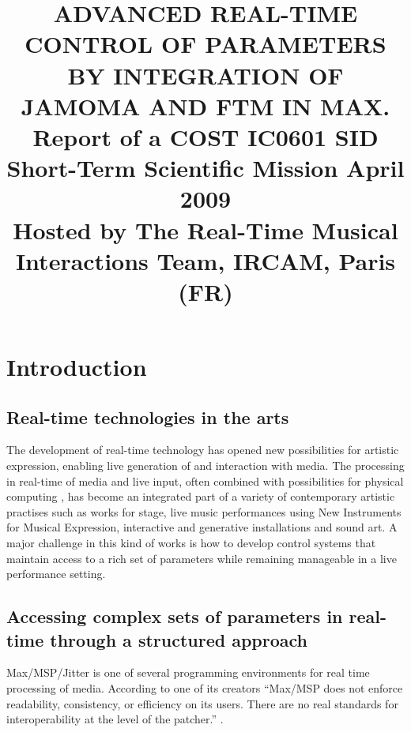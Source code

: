 \documentclass{article}
\title{ADVANCED REAL-TIME CONTROL OF PARAMETERS \\BY INTEGRATION OF JAMOMA AND FTM IN MAX.\\
Report of a COST IC0601 SID Short-Term Scientific Mission April 2009 \\Hosted by The Real-Time Musical Interactions Team, IRCAM, Paris (FR)}
\begin{document}
%    
\sloppy
\maketitle
%

\permission

\begin{abstract}  



\end{abstract}

\section{Introduction}\label{sec:introduction}        


\subsection{Real-time technologies in the arts}

The development of real-time technology has opened new possibilities for artistic expression, enabling live generation of and interaction with media. The processing in real-time of media and live input, often combined with possibilities for physical computing \cite{Sullivan_2004_physical_computing}, has become an integrated part of a variety of contemporary artistic practises such as works for stage, live music performances using New Instruments for Musical Expression, interactive and generative installations and sound art. A major challenge in this kind of works is how to develop control systems that maintain access to a rich set of parameters while remaining manageable in a live performance setting.

\subsection{Accessing complex sets of parameters in real-time through a structured approach}

Max/MSP/Jitter is one of several programming environments for real time processing of media. According to one of its creators ``Max/MSP does not enforce readability, consistency, or efficiency on its users. There are no real standards for interoperability at the level of the patcher.'' \cite{Zicarelli:2002_program_that_do_nothing}.
\end{document}
